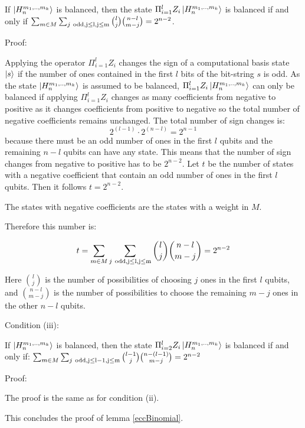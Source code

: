 \documentclass[12pt]{iopart}
\begin{document}
If $\ket{H^{m_1,..,m_k}_{n}}$ is balanced, then the state $\Pi_{i=1}^l Z_i\ket{H^{m_1,..,m_k}_{n}}$ is balanced if and only if $\sum_{m \in M}\sum_{j \ \rm{odd}, j \leq l, j \leq m} {l \choose j}{n-l \choose m-j} = 2^{n-2}$.

Proof:

Applying the operator  $\Pi_{i=1}^l Z_i$ changes the sign of a computational basis state $\ket{s}$ if the number of ones contained in the first $l$ bits of the bit-string $s$ is odd.
As the state $\ket{H^{m_1,..,m_k}_{n}}$ is assumed to be balanced, $\Pi_{i=1}^l Z_i\ket{H^{m_1,..,m_k}_{n}}$ can only be balanced if applying $\Pi_{i=1}^l Z_i$ changes as many coefficients from negative to positive as it changes coefficients from positive to negative so the total number of negative coefficients remains unchanged.
The total number of sign changes is:
\begin{equation*}
2^{(l-1)}\cdot2^{(n-l)} = 2^{n-1}
\end{equation*}
because there must be an odd number of ones in the first $l$ qubits and the remaining $n-l$ qubits can have any state. 
This means that the number of sign changes from negative to positive has to be $2^{n-2}$. Let $t$ be the number of states with a negative coefficient that contain an odd number of ones in the first $l$ qubits. Then it follows $t = 2^{n-2}$.

The states with negative coefficients are the states with a weight in $M$.

Therefore this number is:

\begin{equation}
t = \sum_{m \in M}\sum_{j \ \rm{odd}, j \leq l, j \leq m} {l \choose j}{n-l \choose m-j} = 2^{n-2}
\end{equation}

Here ${l \choose j}$ is the number of possibilities of choosing $j$ ones in the first $l$ qubits, and ${n-l \choose m-j}$ is the number of possibilities to choose the remaining $m-j$ ones in the other $n-l$ qubits.

Condition (iii):

If $\ket{H^{m_1,..,m_k}_{n}}$ is balanced, then the state $\Pi_{i=2}^l Z_i\ket{H^{m_1,..,m_k}_{n}}$ is balanced if and only if:
$ \sum_{m \in M}\sum_{j \ \rm{odd}, j \leq l-1, j \leq m} {l-1 \choose j}{n-(l-1) \choose m-j} = 2^{n-2}$

Proof:

The proof is the same as for condition (ii).

This concludes the proof of lemma \ref{eccBinomial}.
\end{document}
